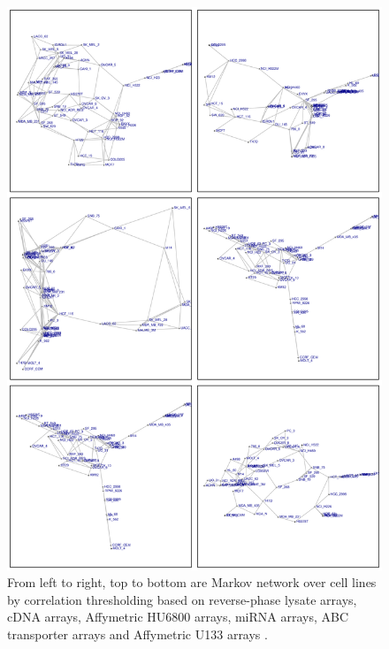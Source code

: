 \documentclass[english]{tktltiki}
\begin{document}
\begin{figure}[t]
\begin{center}
\centering
\includegraphics[width=1.0\columnwidth]{./plots/isomap.pdf}
\caption[Markov network from correlation thresholding over cancer cell lines.]{From left to right, top to bottom are Markov network over cell lines by correlation thresholding based on reverse-phase lysate arrays, cDNA arrays, Affymetric HU6800 arrays, miRNA arrays, ABC transporter arrays and Affymetric U133 arrays \cite{shankavaram09}.}
\label{covariance_thresholding}
\end{center}
\end{figure}
\end{document}
